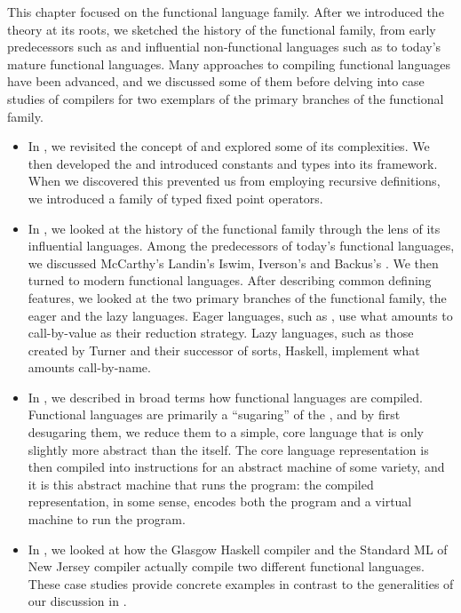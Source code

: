 \label{functional:conclusion}
This chapter focused on the functional language family. After we introduced the theory at its roots, we sketched the history of the functional family, from early predecessors such as  and influential non-functional languages such as  to today's mature functional languages. Many approaches to compiling functional languages have been advanced, and we discussed some of them before delving into case studies of compilers for two exemplars of the primary branches of the functional family.

\begin{itemize}
\item In , we revisited the concept of  and explored some of its complexities. We then developed the \lambdacalc and introduced constants and types into its framework. When we discovered this prevented us from employing recursive definitions, we introduced a family of typed fixed point operators.

\item In , we looked at the history of the functional family through the lens of its influential languages. Among the predecessors of today's functional languages, we discussed McCarthy's  Landin's Iswim, Iverson's  and Backus's . We then turned to modern functional languages. After describing common defining features, we looked at the two primary branches of the functional family, the eager and the lazy languages. Eager languages, such as , use what amounts to call-by-value as their reduction strategy. Lazy languages, such as those created by Turner and their successor of sorts, Haskell, implement what amounts call-by-name.

\item In , we described in broad terms how functional languages are compiled. Functional languages are primarily a ``sugaring'' of the \lambdacalc{}, and by first desugaring them, we reduce them to a simple, core language that is only slightly more abstract than the \lambdacalc itself.%
The core language representation is then compiled into instructions for an abstract machine of some variety, and it is this abstract machine that runs the program: the compiled representation, in some sense, encodes both the program and a virtual machine to run the program.

\item In , we looked at how the Glasgow Haskell compiler and the Standard ML of New Jersey compiler actually compile two different functional languages. These case studies provide concrete examples in contrast to the generalities of our discussion in .
\end{itemize}